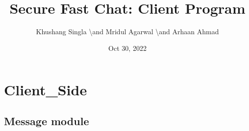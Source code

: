 \documentclass[letterpaper,10pt,english]{sphinxmanual}
\title{Secure Fast Chat: Client Program}
\date{Oct 30, 2022}
\author{Khushang Singla \textbackslash{}and Mridul Agarwal \textbackslash{}and Arhaan Ahmad}
\begin{document}
\pagestyle{empty}
\sphinxmaketitle
\pagestyle{plain}
\sphinxtableofcontents
\pagestyle{normal}
\label{\detokenize{index::doc}}



\chapter{Client\_Side}
\label{\detokenize{modules:client-side}}\label{\detokenize{modules::doc}}

\section{Message module}
\label{\detokenize{Message:module-Message}}\label{\detokenize{Message:message-module}}\label{\detokenize{Message::doc}}
\end{document}
